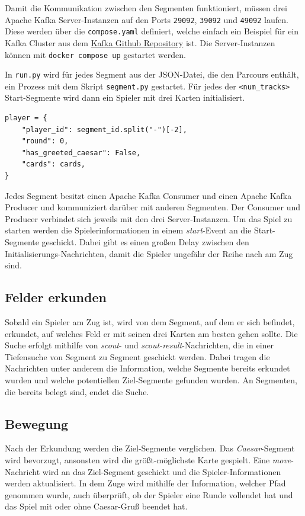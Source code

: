 \documentclass[]{article}
\begin{document}
Damit die Kommunikation zwischen den Segmenten funktioniert, müssen drei Apache Kafka Server-Instanzen auf den Ports \texttt{29092}, \texttt{39092} und \texttt{49092} laufen. Diese werden über die \texttt{compose.yaml} definiert, welche einfach ein Beispiel für ein Kafka Cluster aus dem \href{https://github.com/apache/kafka/blob/trunk/docker/examples/docker-compose-files/cluster/combined/plaintext/docker-compose.yml}{Kafka Github Repository} ist. Die Server-Instanzen können mit \texttt{docker compose up} gestartet werden.\par
In \texttt{run.py} wird für jedes Segment aus der JSON-Datei, die den Parcours enthält, ein Prozess mit dem Skript \texttt{segment.py} gestartet. Für jedes der \texttt{<num\_tracks>} Start-Segmente wird dann ein Spieler mit drei Karten initialisiert.
\begin{verbatim}
player = {
    "player_id": segment_id.split("-")[-2],
    "round": 0,
    "has_greeted_caesar": False,
    "cards": cards,
}
\end{verbatim}
Jedes Segment besitzt einen Apache Kafka Consumer und einen Apache Kafka Producer und kommuniziert darüber mit anderen Segmenten. Der Consumer und Producer verbindet sich jeweils mit den drei Server-Instanzen. Um das Spiel zu starten werden die Spielerinformationen in einem \emph{start}-Event an die Start-Segmente geschickt. Dabei gibt es einen großen Delay zwischen den Initialisierungs-Nachrichten, damit die Spieler ungefähr der Reihe nach am Zug sind.

\subsection{Felder erkunden}
\label{subsec:scouting}

Sobald ein Spieler am Zug ist, wird von dem Segment, auf dem er sich befindet, erkundet, auf welches Feld er mit seinen drei Karten am besten gehen sollte. Die Suche erfolgt mithilfe von \emph{scout}- und \emph{scout-result}-Nachrichten, die in einer Tiefensuche von Segment zu Segment geschickt werden. Dabei tragen die Nachrichten unter anderem die Information, welche Segmente bereits erkundet wurden und welche potentiellen Ziel-Segmente gefunden wurden. An Segmenten, die bereits belegt sind, endet die Suche.

\subsection{Bewegung}
\label{subsec:move}

Nach der Erkundung werden die Ziel-Segmente verglichen. Das \emph{Caesar}-Segment wird bevorzugt, ansonsten wird die größt-möglichste Karte gespielt. Eine \emph{move}-Nachricht wird an das Ziel-Segment geschickt und die Spieler-Informationen werden aktualisiert. In dem Zuge wird mithilfe der Information, welcher Pfad genommen wurde, auch überprüft, ob der Spieler eine Runde vollendet hat und das Spiel mit oder ohne Caesar-Gruß beendet hat.
\end{document}

